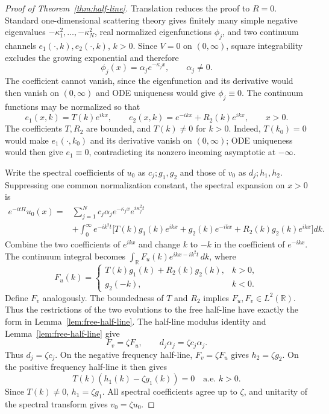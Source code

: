 \documentclass[11pt]{amsart}
\numberwithin{equation}{section}
\theoremstyle{remark}
\newcommand{\R}{\mathbb R}
\begin{document}
\begin{proof}[Proof of Theorem~\ref{thm:half-line}]
Translation reduces the proof to $R=0$.  Standard one-dimensional scattering
theory gives finitely many simple negative eigenvalues
$-\kappa_1^2,\ldots,-\kappa_N^2$, real normalized eigenfunctions $\phi_j$,
and two continuum channels $e_1(\cdot,k),e_2(\cdot,k)$, $k>0$.  Since $V=0$
on $(0,\infty)$, square integrability excludes the growing exponential and
therefore
\[
 \phi_j(x)=\alpha_j e^{-\kappa_jx},\qquad \alpha_j\ne0.
\]
The coefficient cannot vanish, since the eigenfunction and its derivative
would then vanish on $(0,\infty)$ and ODE uniqueness would give
$\phi_j\equiv0$.  The continuum functions may be normalized so that
\[
 e_1(x,k)=T(k)e^{ikx},
 \qquad
 e_2(x,k)=e^{-ikx}+R_2(k)e^{ikx},
 \qquad x>0.
\]
The coefficients $T,R_2$ are bounded, and $T(k)\ne0$ for $k>0$.  Indeed,
$T(k_0)=0$ would make $e_1(\cdot,k_0)$ and its derivative vanish on
$(0,\infty)$; ODE uniqueness would then give $e_1\equiv0$, contradicting its
nonzero incoming asymptotic at $-\infty$.

Write the spectral coefficients of $u_0$ as
$c_j;g_1,g_2$ and those of $v_0$ as $d_j;h_1,h_2$.  Suppressing one common
normalization constant, the spectral expansion on $x>0$ is
\begin{align*}
 e^{-itH}u_0(x)
 ={}&\sum_{j=1}^N c_j\alpha_j e^{-\kappa_jx}e^{i\kappa_j^2t}\\
 &+\int_0^\infty e^{-ik^2t}
 \bigl[T(k)g_1(k)e^{ikx}
 +g_2(k)e^{-ikx}+R_2(k)g_2(k)e^{ikx}\bigr]dk.
\end{align*}
Combine the two coefficients of $e^{ikx}$ and change $k$ to $-k$ in the
coefficient of $e^{-ikx}$.  The continuum integral becomes
$\int_\R F_u(k)e^{ikx-ik^2t}\,dk$, where
\[
 F_u(k)=
 \begin{cases}
 T(k)g_1(k)+R_2(k)g_2(k),&k>0,\\
 g_2(-k),&k<0.
 \end{cases}
\]
Define $F_v$ analogously.  The boundedness of $T$ and $R_2$ implies
$F_u,F_v\in L^2(\R)$.  Thus the restrictions of the two evolutions to the free
half-line have exactly the form in Lemma~\ref{lem:free-half-line}.
The half-line modulus identity and Lemma~\ref{lem:free-half-line} give
\[
 F_v=\zeta F_u,
 \qquad d_j\alpha_j=\zeta c_j\alpha_j.
\]
Thus $d_j=\zeta c_j$.  On the negative frequency half-line,
$F_v=\zeta F_u$ gives $h_2=\zeta g_2$.  On the positive frequency half-line it
then gives
\[
 T(k)(h_1(k)-\zeta g_1(k))=0
 \quad\text{a.e. }k>0.
\]
Since $T(k)\ne0$, $h_1=\zeta g_1$.  All spectral coefficients agree up to
$\zeta$, and unitarity of the spectral transform gives $v_0=\zeta u_0$.
\end{proof}
\end{document}
